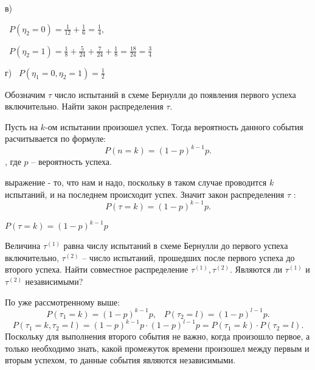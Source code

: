 \begin{subtask}{в)}

\smallskip
\noindent\textbullet~$P(\eta_2 = 0) = \frac{1}{12} + \frac{1}{6} = \frac{1}{4}$,

\smallskip
\noindent\textbullet~$P(\eta_2 = 1) = \frac{1}{8} + \frac{5}{24} + \frac{7}{24} + \frac{1}{8} =
\frac{18}{24} = \frac{3}{4}$
\end{subtask}


\begin{subtask}{г)}
\noindent\textbullet~$P(\eta_1 = 0, \eta_2 = 1) = \frac{1}{2}$
\end{subtask}

\medskip
\begin{task}{14}
  Обозначим $\tau$ число испытаний в схеме Бернулли до появления первого успеха включительно. Найти
  закон распределения $\tau$.
\end{task}

\begin{solution}
Пусть на $k$-ом испытании произошел успех. Тогда вероятность данного события расчитывается по
формуле: \[
  P(n = k) = (1 - p)^{k - 1} p
.\], где $p$ -- вероятность успеха.

\smallskip
{} выражение - то, что нам и надо, поскольку в таком случае проводится $k$ испытаний, 
и на последнем происходит успех.  Значит закон распределения $\tau$ :
\[
P(\tau = k) = (1 - p)^{k - 1} p
.\] 
\end{solution}

\begin{result}
$P(\tau = k) = (1 - p)^{k - 1} p$
\end{result}
\medskip
\begin{task}{15}
  Величина $\tau^{\left(1\right)}$ равна числу испытаний в схеме Бернулли до первого успеха
  включительно, $\tau^{\left(2\right)}$ -- число испытаний, прошедших после первого успеха до 
  второго успеха. Найти совместное распределение $\tau^{(1)}, \tau^{(2)}$. Являются ли $\tau^{(1)}$ 
  и $\tau^{(2)}$ независимыми?
\end{task}

\begin{solution}
По уже рассмотренному выше:
\[
P(\tau_1 = k) = (1 - p)^{k - 1} p, \;\;\; P(\tau_2 = l) = (1 - p)^{l - 1} p
.\] 
\[
P(\tau_1 = k, \tau_2 = l) = (1 - p)^{k - 1} p \cdot  (1 - p)^{l - 1} p = P(\tau_1 = k) \cdot
P(\tau_2 = l)
.\]Поскольку для выполнения второго события не важно, когда произошло первое, а только необходимо
знать, какой промежуток времени произошел между первым и вторым успехом, то данные события являются независимыми.
\end{solution}

